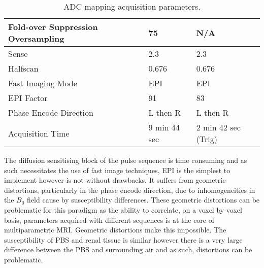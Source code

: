 \begin{table}[H]
\begin{tabularx}{1.0\textwidth}{|X|X|X|}
		Fold-over Suppression Oversampling & 75                                                                               & N/A                                                                              \\ \hline
		Sense                              & 2.3                                                                              & 2.3                                                                              \\ \hline
		Halfscan                           & 0.676                                                                            & 0.676                                                                            \\ \hline
		Fast Imaging Mode                  & EPI                                                                              & EPI                                                                              \\ \hline
		EPI Factor                         & 91                                                                               & 83                                                                               \\ \hline
		Phase Encode Direction             & L then R                                                                         & L then R                                                                         \\ \hline
		Acquisition Time                   & 9 min 44 sec                                                                     & 2 min 42 sec (Trig)                                                              \\ \hline
	\end{tabularx}
	\caption{\ac{ADC} mapping acquisition parameters.}
	\label{tab:ex_adc_mapping}
\end{table}

The diffusion sensitising block of the pulse sequence is time consuming and as such necessitates the use of fast image techniques, \ac{EPI} is the simplest to implement however is not without drawbacks. It suffers from geometric distortions, particularly in the phase encode direction, due to inhomogeneities in the $B_0$ field cause by susceptibility differences. These geometric distortions can be problematic for this paradigm as the ability to correlate, on a voxel by voxel basis, parameters acquired with different sequences is at the core of multiparametric \ac{MRI}. Geometric distortions make this impossible. The susceptibility of \ac{PBS} and renal tissue is similar however there is a very large difference between the \ac{PBS} and surrounding air and as such, distortions can be problematic. 

